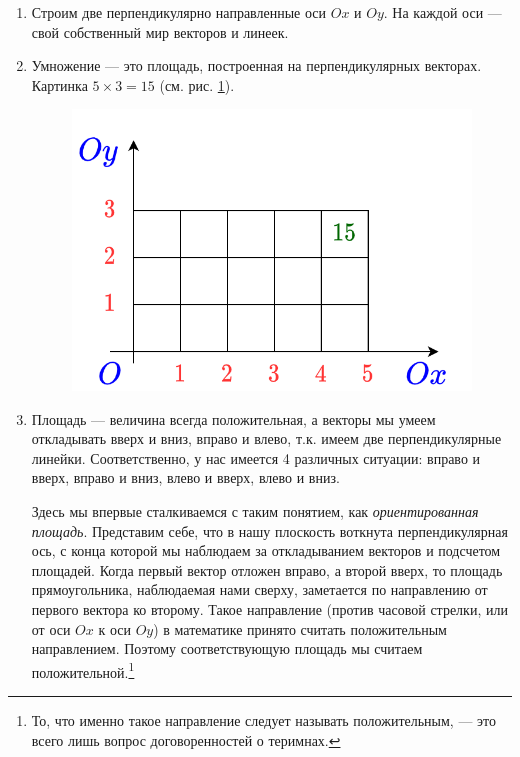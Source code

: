 \begin{enumerate}
\item Строим две перпендикулярно направленные оси $Ox$ и $Oy$. На каждой оси --- свой собственный мир векторов и линеек.
\item Умножение --- это площадь, построенная на перпендикулярных векторах. Картинка $5\times 3=15$ (см. рис. \ref{prod}).
\begin{figure}[hbt!]
\begin{center}
\includegraphics[scale=0.2]{prod.png}
\end{center}
\caption{}\label{prod}
\end{figure}
\item Площадь --- величина всегда положительная, а векторы мы умеем откладывать вверх и вниз, вправо и влево, т.к. имеем две перпендикулярные линейки. Соответственно, у нас имеется 4 различных ситуации: вправо и вверх, вправо и вниз, влево и вверх, влево и вниз.

Здесь мы впервые сталкиваемся с таким понятием, как \textit{ориентированная площадь}. Представим себе, что в нашу плоскость воткнута перпендикулярная ось, с конца которой мы наблюдаем за откладыванием векторов и подсчетом площадей. Когда первый вектор отложен вправо, а второй вверх, то площадь прямоугольника, наблюдаемая нами сверху, заметается по направлению от первого вектора ко второму. Такое направление (против часовой стрелки, или от оси $Ox$ к оси $Oy$) в математике принято считать положительным направлением. Поэтому соответствующую площадь мы считаем положительной.\footnote{То, что именно такое направление следует называть положительным, --- это всего лишь вопрос договоренностей о теримнах.}


\end{enumerate}
